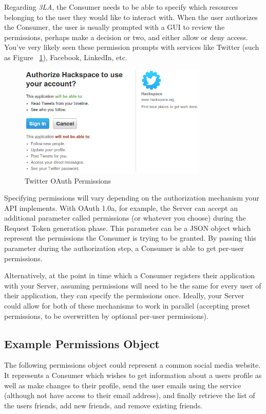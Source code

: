 \documentclass{book}
\begin{document}
Regarding \emph{3LA}, the Consumer needs to be able to specify which resources belonging to the user they would like to interact with. When the user authorizes the Consumer, the user is usually prompted with a GUI to review the permissions, perhaps make a decision or two, and either allow or deny access. You've very likely seen these permission prompts with services like Twitter (such as Figure ~\ref{fig:twitteroauth}), Facebook, LinkedIn, etc.

\begin{figure}[ht!]
\centering
\includegraphics[width=90mm]{images/permissions-twitter.png}
\caption{Twitter OAuth Permissions}
\label{fig:twitteroauth}
\end{figure}

Specifying permissions will vary depending on the authorization mechanism your API implements. With OAuth 1.0a, for example, the Server can accept an additional parameter called permissions (or whatever you choose) during the Request Token generation phase. This parameter can be a JSON object which represent the permissions the Consumer is trying to be granted. By passing this parameter during the authorization step, a Consumer is able to get per-user permissions.

Alternatively, at the point in time which a Consumer registers their application with your Server, assuming permissions will need to be the same for every user of their application, they can specify the permissions once. Ideally, your Server could allow for both of these mechanisms to work in parallel (accepting preset permissions, to be overwritten by optional per-user permissions).

\subsection{Example Permissions Object}

The following permissions object could represent a common social media website. It represents a Consumer which wishes to get information about a users profile as well as make changes to their profile, send the user emails using the service (although not have access to their email address), and finally retrieve the list of the users friends, add new friends, and remove existing friends.
\end{document}
